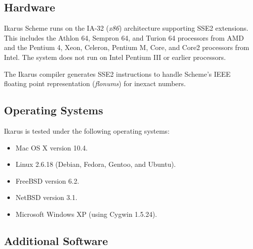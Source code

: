 \documentclass[onecolumn, 12pt, twoside, openright, dvipdfm]{book}
\begin{document}
\subsection{Hardware}

Ikarus Scheme runs on the IA-32 (\emph{x86}) architecture
supporting SSE2 extensions.  This includes the Athlon 64,
Sempron 64, and Turion 64 processors from AMD and the Pentium 4, Xeon,
Celeron, Pentium M, Core, and Core2 processors from Intel.  The
system does not run on Intel Pentium III or earlier
processors.

The Ikarus compiler generates SSE2 instructions to handle Scheme's
IEEE floating point representation (\emph{flonums}) for inexact
numbers. 

\subsection{Operating Systems}

Ikarus is tested under the following operating systems:

\begin{itemize}
\item Mac OS X version 10.4.
\item Linux 2.6.18 (Debian, Fedora, Gentoo, and Ubuntu).
\item FreeBSD version 6.2.
\item NetBSD version 3.1.
\item Microsoft Windows XP (using Cygwin 1.5.24).
\end{itemize}

\subsection{Additional Software}
\end{document}
